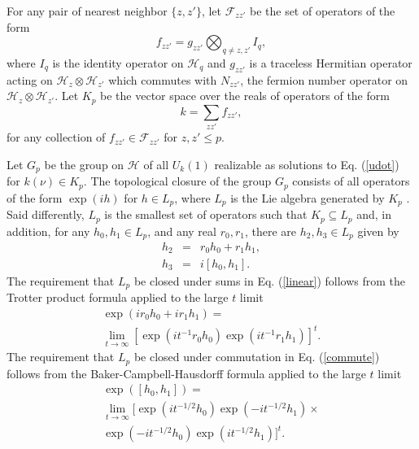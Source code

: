 \documentclass[twocolumn,amsmath,amssymb]{revtex4-1}
\begin{document}
For any pair of nearest neighbor  $\{z, z'\}$, let
$\mathcal{F}_{z z'}$ be the set of operators
of the form
\begin{equation}
\label{defhfa}
f_{zz'} =  g_{zz'} \bigotimes_{q \ne z,z'} I_q,
\end{equation}
where $I_q$ is the identity operator on $\mathcal{H}_q$
and $g_{zz'}$
is a traceless Hermitian operator acting on
$\mathcal{H}_z \otimes \mathcal{H}_{z'}$ which commutes with $N_{zz'}$, the fermion
number operator on $\mathcal{H}_z \otimes \mathcal{H}_{z'}$.
Let $K_p$ be the vector space over the reals of operators
of the form
\begin{equation}
\label{defka}
k = \sum_{zz'} f_{zz'},
\end{equation}
for any collection of
$f_{z z'} \in \mathcal{F}_{zz'}$ for $z, z' \le p$.

Let $G_p$ be the group on 
$\mathcal{H}$
of all $U_k(1)$ realizable as solutions to Eq. (\ref{udot}) 
for $k(\nu) \in K_p$. 
The topological closure of the group
$G_p$ consists of all operators of the form
$\exp( i h)$ for $h \in L_p$, where $L_p$ is the 
Lie algebra generated by $K_p$ \cite{Divincenzo}.
Said differently,  $L_p$ is the smallest set of operators 
such that  $K_p \subseteq L_p$ and, in addition, for
any $h_0, h_1 \in L_p$, and any real $r_0, r_1$,
there are $h_2, h_3 \in L_p$ given by
\begin{subequations}
\begin{eqnarray}
\label{linear}
h_2 & = & r_0 h_0 + r_1 h_1, \\
\label{commute}
h_3 & = & i [ h_0, h_1].
\end{eqnarray}
\end{subequations}
The requirement that $L_p$ be closed under
sums in Eq. (\ref{linear}) follows from the Trotter product
formula applied to the large $t$ limit 
\begin{multline}
\label{linearx}
\exp( i r_0 h_0 + i r_1 h_1) = \\
\lim_{t \rightarrow \infty }[ \exp( i t^{-1}r_0 h_0) \exp( i t^{-1} r_1 h_1)]^t.
\end{multline}
The requirement that $L_p$ be closed under commutation in
Eq. (\ref{commute}) follows from the 
Baker-Campbell-Hausdorff 
formula applied to the large $t$ limit 
\begin{multline}
\label{commutex}
\exp( [ h_0, h_1]) = \\ \lim_{t \rightarrow \infty}
[ \exp( i t^{-1/2} h_0) \exp( -i t^{-1/2} h_1) \times \\  
\exp( -i t^{-1/2} h_0) \exp( i t^{-1/2} h_1)]^t.
\end{multline}
\end{document}
